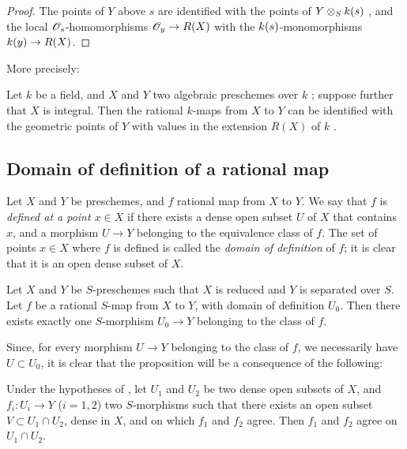 \begin{proof}
The points of $Y$ above $s$ are identified with the points of $Y\otimes_Sk(s)$ , and the local $\mathscr{O}_s$-homomorphisms $\sh{O}_y\to R(X)$ with the $k(s)$-monomorphisms $\kres(y)\to R(X)$.
\end{proof}

More precisely:
\begin{corollary}[7.1.16]
\label{I.7.1.16}
Let $k$ be a field, and $X$ and $Y$ two algebraic preschemes over $k$ ; suppose further that $X$ is integral.
Then the rational $k$-maps from $X$ to $Y$ can be identified with the geometric points of $Y$ with values in the extension $R(X)$ of $k$ .
\end{corollary}

\subsection{Domain of definition of a rational map}
\label{subsection:I.7.2}

\begin{env}[7.2.1]
\label{I.7.2.1}
Let $X$ and $Y$ be preschemes, and $f$ rational map from $X$ to $Y$.
We say that $f$ is \emph{defined at a point $x\in X$} if there exists a dense open subset $U$ of $X$ that contains $x$, and a morphism $U\to Y$ belonging to the equivalence class of $f$.
The set of points $x\in X$ where $f$ is defined is called the \emph{domain of definition} of $f$; it is clear that it is an open dense subset of $X$.
\end{env}

\begin{proposition}[7.2.2]
\label{I.7.2.2}
Let
$X$ and $Y$ be $S$-preschemes such that $X$ is reduced and $Y$ is separated over $S$.
Let $f$ be a rational $S$-map from $X$ to $Y$, with domain of definition $U_0$.
Then there exists exactly one $S$-morphism $U_0\to Y$ belonging to the class of $f$.
\end{proposition}

Since, for every morphism $U\to Y$ belonging to the class of $f$, we necessarily have $U\subset U_0$, it is clear that the proposition will be a consequence of the following:

\begin{lemma}[7.2.2.1]
\label{I.7.2.2.1}
Under the hypotheses of , let $U_1$ and $U_2$ be two dense open subsets of $X$, and $f_i:U_i\to Y$ ($i=1,2$) two $S$-morphisms such that there exists an open subset $V\subset U_1\cap U_2$, dense in $X$, and on which $f_1$ and $f_2$ agree.
Then $f_1$ and $f_2$ agree on $U_1\cap U_2$.
\end{lemma}

